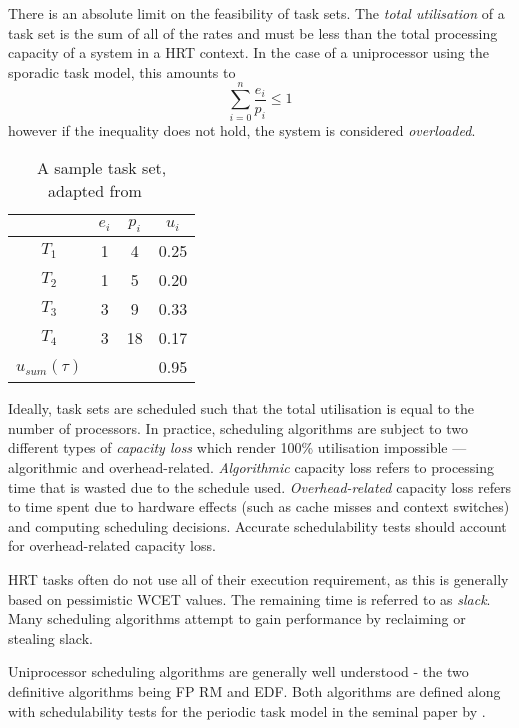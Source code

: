 There is an absolute limit on the feasibility of task sets.
The \emph{total utilisation} of a task set is the sum of all of the rates and must be less than the total processing capacity of a system in a \gls{HRT} context.
In the case of a uniprocessor using the sporadic task model, this amounts to
\begin{equation*}
	\sum\limits_{i=0}^n \dfrac{e_{i}}{p_{i}} \leq 1
\end{equation*}
however if the inequality does not hold, the system is considered \emph{overloaded}.

\begin{table}
	\begin{center}
		\begin{tabular}{ | c | c  c  c |} \hline
			         & $e_{i}$ & $p_{i}$ & $u_{i} $ \\ \hline
			$ T_{1}$ & 1 & 4 & 0.25 \\
			$ T_{2}$ & 1 & 5 & 0.20 \\
			$ T_{3}$ & 3 & 9 & 0.33 \\
			$ T_{4}$ & 3 & 18 & 0.17  \\ \hline
	$ u_{sum}(\tau)$ & &  & 0.95 \\ \hline
		\end{tabular}
		\caption{A sample task set, adapted from ~\citep{Brandenburg:phd}}
		\label{tab:example_task_set}
	\end{center}
\end{table}

Ideally, task sets are scheduled such that the total utilisation is equal to the number of processors.
In practice, scheduling algorithms are subject to two different types of \emph{capacity loss} which render 100\% utilisation impossible --- algorithmic and overhead-related.
\emph{Algorithmic} capacity loss refers to processing time that is wasted due to the schedule used.
\emph{Overhead-related} capacity loss refers to time spent due to hardware effects (such as cache misses and context switches) and computing scheduling decisions.
Accurate schedulability tests should account for overhead-related capacity loss.

\gls{HRT} tasks often do not use all of their execution requirement, as this is generally based on pessimistic \gls{WCET} values.
The remaining time is referred to as \emph{slack}.
Many scheduling algorithms attempt to gain performance by reclaiming or stealing slack.


Uniprocessor scheduling algorithms are generally well understood - the two definitive algorithms being \acrlong{FP} \acrlong{RM} and \acrlong{EDF}.
Both algorithms are defined along with schedulability tests for the periodic task model in the seminal paper by \citet{Liu_Layland_73}.

